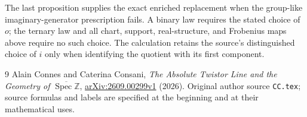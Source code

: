 The last proposition supplies the exact enriched replacement when the
group-like imaginary-generator prescription fails.  A binary law
requires the stated choice of $o$; the ternary law and all chart,
support, real-structure, and Frobenius maps above require no such
choice.  The calculation retains the source's distinguished choice
of $i$ only when identifying the quotient with its first component.

\begin{thebibliography}{9}
Alain Connes and Caterina Consani,
\emph{The Absolute Twistor Line and the Geometry of
$\overline{\operatorname{Spec}\mathbb Z}$},
\href{https://arxiv.org/abs/2609.00299v1}{arXiv:2609.00299v1} (2026).
Original author source \texttt{CC.tex}; source formulas and labels are
specified at the beginning and at their mathematical uses.
\end{thebibliography}
